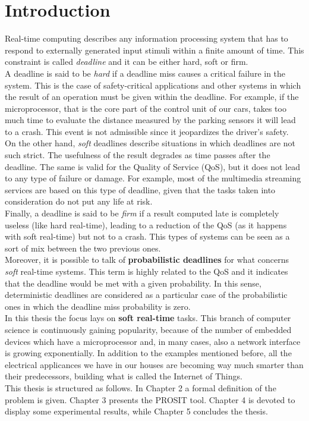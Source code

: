 \chapter{Introduction}\label{chp:introduction}


Real-time computing \cite{hardrealtime} describes any information processing system that has to respond to externally generated input stimuli within a finite amount of time. This constraint is called \emph{deadline} and it can be either hard, soft or firm.\\
A deadline is said to be \emph{hard} if a deadline miss causes a critical failure in the system. This is the case of safety-critical applications and other systems in which the result of an operation must be given within the deadline. For example, if the microprocessor, that is the core part of the control unit of our cars, takes too much time to evaluate the distance measured by the parking sensors it will lead to a crash. This event is not admissible since it jeopardizes the driver's safety.\\
On the other hand, \emph{soft} deadlines describe situations in which deadlines are not such strict. The usefulness of the result degrades as time passes after the deadline. The same is valid for the Quality of Service (QoS), but it does not lead to any type of failure or damage. For example, most of the multimedia streaming services are based on this type of deadline, given that the tasks taken into consideration do not put any life at risk.\\
Finally, a deadline is said to be \emph{firm} if a result computed late is completely useless (like hard real-time), leading to a reduction of the QoS (as it happens with soft real-time) but not to a crash. This types of systems can be seen as a sort of mix between the two previous ones.\\
Moreover, it is possible to talk of \textbf{probabilistic deadlines} \cite{abeni} for what concerns \emph{soft} real-time systems. This term is highly related to the QoS and it indicates that the deadline would be met with a given probability. In this sense, deterministic deadlines are considered as a particular case of the probabilistic ones in which the deadline miss probability is zero.\\ 
In this thesis the focus lays on \textbf{soft real-time} tasks. This branch of computer science is continuously gaining popularity, because of the number of embedded devices which have a microprocessor and, in many cases, also a network interface is growing exponentially. In addition to the examples mentioned before, all the electrical applicances we have in our houses are becoming way much smarter than their predecessors, building what is called the Internet of Things.\\
This thesis is structured as follows. In Chapter 2 a formal definition of the problem is given. Chapter 3 presents the PROSIT tool. Chapter 4 is devoted to display some experimental results, while Chapter 5 concludes the thesis.      